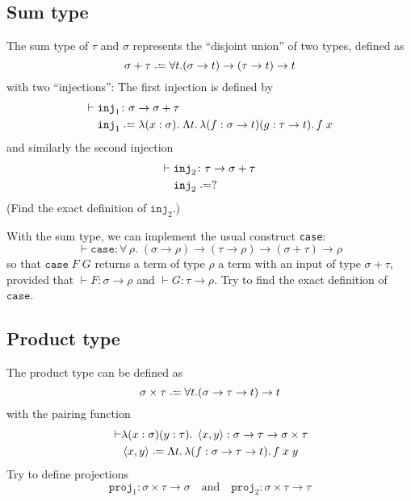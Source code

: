 \subsection{Sum type}
The sum type of $\tau$ and $\sigma$ represents the
``disjoint union'' of two types, defined as
\[
  \sigma + \tau \defeq \forall t. (\sigma \to t) \to (\tau \to t) \to t
\]
with two ``injections'': The first injection is defined by
\begin{align*}
  \vdash {} & \mathtt{inj}_1 \colon \sigma \to \sigma + \tau \\
  & \mathtt{inj}_1 \defeq \lambda (x : \sigma).\;\Lambda t.\,\lambda (f :
  \sigma\to t)(g : \tau\to t).\, f\;x 
\end{align*}
and similarly the second injection
\begin{align*}
  \vdash {} & \mathtt{inj}_2 \colon \tau \to \sigma + \tau \\
  & \mathtt{inj}_2 \defeq ?
\end{align*}
(Find the exact definition of $\mathtt{inj}_2$.)

With the sum type, we can implement the usual construct \texttt{case}:
\[
  \vdash \mathtt{case} : \forall\,\rho.\;(\sigma \to \rho) \to (\tau \to \rho)
  \to (\sigma + \tau) \to \rho
\]
so that $\mathtt{case}\;F\;G$ returns a term of type $\rho$ a term with an input
of type $\sigma + \tau$, provided that $\vdash F : \sigma\to\rho$ and $\vdash G
: \tau \to \rho$. Try to find the exact definition of $\mathtt{case}$.
\subsection{Product type}
The product type can be defined as
\[
  \sigma \times \tau \defeq \forall t. (\sigma \to \tau \to t) \to t
\]
with the pairing function
\begin{align*}
  {} \vdash & \lambda (x : \sigma)(y : \tau).\; \left< x, y\right> :
  \sigma \to \tau \to \sigma
  \times \tau \\
  & \left< x, y\right> \defeq \Lambda t.\,\lambda (f : \sigma \to \tau \to t).\,
  f\;x\;y
\end{align*}
Try to define projections 
\[
  \mathtt{proj}_1 : \sigma \times \tau \to \sigma
  \quad\text{and}\quad
  \mathtt{proj}_2 : \sigma\times \tau \to \tau
\]
